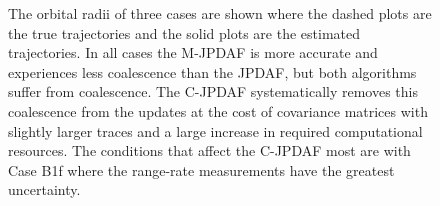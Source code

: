 \begin{figure}
{
\centerline{
	}
\centerline{
	}
\centerline{
	}
}
\caption{The orbital radii of three cases are shown where the dashed plots are the true trajectories and the solid plots are the estimated trajectories.
In all cases the M-JPDAF is more accurate and experiences less coalescence than the JPDAF, but both algorithms suffer from coalescence.
The C-JPDAF systematically removes this coalescence from the updates at the cost of covariance matrices with slightly larger traces and a large increase in required computational resources.
The conditions that affect the C-JPDAF most are with Case B1f where the range-rate measurements have the greatest uncertainty.
}\label{fig:B1}
\end{figure}

